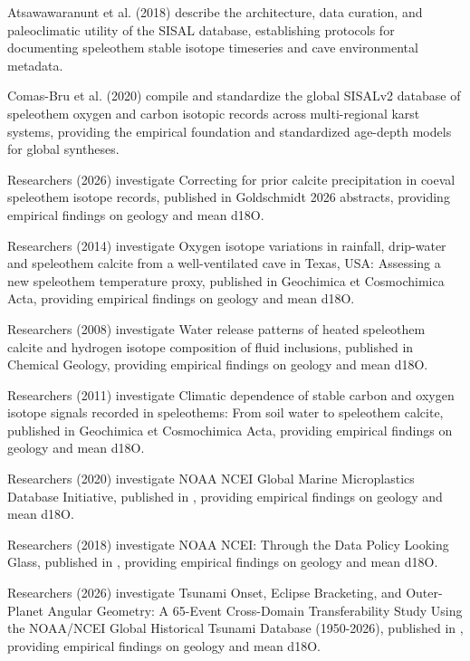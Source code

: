 \documentclass[sn-basic,Numbered]{sn-jnl}%
\begin{document}
Atsawawaranunt et al. (2018) describe the architecture, data curation, and paleoclimatic utility of the SISAL database, establishing protocols for documenting speleothem stable isotope timeseries and cave environmental metadata. \cite{atsawawaranunt2018_11}

Comas-Bru et al. (2020) compile and standardize the global SISALv2 database of speleothem oxygen and carbon isotopic records across multi-regional karst systems, providing the empirical foundation and standardized age-depth models for global syntheses. \cite{comasbru2020_12}

Researchers (2026) investigate Correcting for prior calcite precipitation in coeval speleothem isotope records, published in Goldschmidt 2026 abstracts, providing empirical findings on geology and mean d18O. \cite{olson2026_13}

Researchers (2014) investigate Oxygen isotope variations in rainfall, drip-water and speleothem calcite from a well-ventilated cave in Texas, USA: Assessing a new speleothem temperature proxy, published in Geochimica et Cosmochimica Acta, providing empirical findings on geology and mean d18O. \cite{feng2014_14}

Researchers (2008) investigate Water release patterns of heated speleothem calcite and hydrogen isotope composition of fluid inclusions, published in Chemical Geology, providing empirical findings on geology and mean d18O. \cite{verheyden2008_15}

Researchers (2011) investigate Climatic dependence of stable carbon and oxygen isotope signals recorded in speleothems: From soil water to speleothem calcite, published in Geochimica et Cosmochimica Acta, providing empirical findings on geology and mean d18O. \cite{dreybrodt2011_16}

Researchers (2020) investigate NOAA NCEI Global Marine Microplastics Database Initiative, published in , providing empirical findings on geology and mean d18O. \cite{nyadjro2020_17}

Researchers (2018) investigate NOAA NCEI: Through the Data Policy Looking Glass, published in , providing empirical findings on geology and mean d18O. \cite{ritchey2018_18}

Researchers (2026) investigate Tsunami Onset, Eclipse Bracketing, and Outer-Planet Angular Geometry: A 65-Event Cross-Domain Transferability Study Using the NOAA/NCEI Global Historical Tsunami Database (1950-2026), published in , providing empirical findings on geology and mean d18O. \cite{akkinapragada2026_19}
\end{document}

